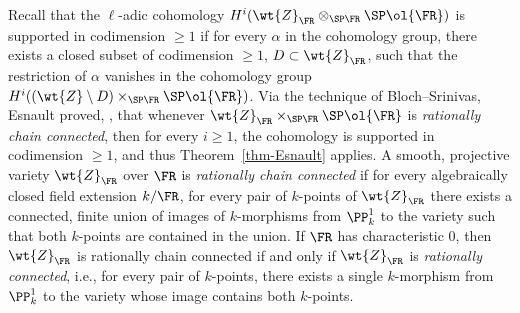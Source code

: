 Recall that the $\ell$-adic cohomology $H^i(\wt{Z}_\FR \otimes_{\SP \FR}
\SP \ol{\FR})$ is supported in codimension $\geq 1$ if for every $\alpha$ in the cohomology group, there exists a closed subset of codimension $\geq 1$, $D\subset \wt{Z}_\FR$, such that the restriction of $\alpha$ vanishes in the cohomology group $H^i((\wt{Z}\setminus D)\times_{\SP \FR} \SP \ol{\FR})$. Via the technique of Bloch--Srinivas, Esnault proved, \cite{Esnault}, that whenever $\wt{Z}_\FR\times_{\SP \FR} \SP \ol{\FR}$ is \emph{rationally chain connected}, then for every $i\geq 1$, the cohomology is supported in codimension $\geq 1$, and thus Theorem~\ref{thm-Esnault} applies. A smooth, projective variety $\wt{Z}_\FR$ over $\FR$ is \emph{rationally chain connected} if for every algebraically closed field extension $k/\FR$, for every pair of $k$-points of $\wt{Z}_\FR$ there exists a connected, finite union of images of $k$-morphisms from $\PP^1_k$ to the variety such that both $k$-points are contained in the union. If $\FR$ has characteristic $0$, then $\wt{Z}_\FR$ is rationally chain connected if and only if $\wt{Z}_\FR$ is \emph{rationally connected}, i.e., for every pair of $k$-points, there exists a single $k$-morphism from $\PP^1_k$ to the variety whose image contains both $k$-points.

